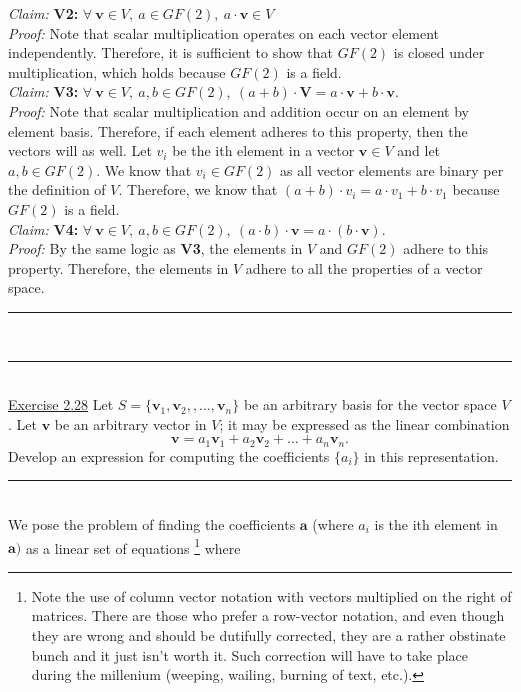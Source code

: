 \documentclass{article}
\newcommand{\problemsep}{\leavevmode\\[0.05in] \rule[\baselineskip/4]{\textwidth}{1pt} \\[0.005in] \rule[\baselineskip]{\textwidth}{1pt}\vspace{-\baselineskip}\leavevmode\\[0.05in]}
\newcommand{\statementsep}{\leavevmode\\[0.005in] \rule[\baselineskip/4]{\textwidth}{0.4pt}\leavevmode\\[0.005in]}
\begin{document}
{\it Claim: } {\bf V2: } $\forall \ \mathbf{v} \in V, \ a \in GF(2), \ a\cdot \mathbf{v} \in V$ \\[0.05in]
{\it Proof: } Note that scalar multiplication operates on each vector element independently. Therefore, it is sufficient to show that $GF(2)$ is closed under multiplication, which holds because $GF(2)$ is a field. \\[0.05in]
{\it Claim: } {\bf V3: } $\forall \ \mathbf{v} \in V, \ a,b \in GF(2), \ (a + b)\cdot \mathbf{V} = a\cdot\mathbf{v} + b\cdot\mathbf{v}$.\\[0.05in]
{\it Proof: } Note that scalar multiplication and addition occur on an element by element basis. Therefore, if each element adheres to this property, then the vectors will as well. Let $v_i$ be the ith element in a vector $\mathbf{v} \in V$ and let $a,b \in GF(2)$. We know that $v_i \in GF(2)$ as all vector elements are binary per the definition of $V$. Therefore, we know that $(a + b)\cdot v_i = a\cdot v_1 + b\cdot v_1$ because $GF(2)$ is a field. \\[0.05in]
{\it Claim: } {\bf V4: } $\forall \ \mathbf{v} \in V, \ a,b \in GF(2), \ (a\cdot b)\cdot \mathbf{v} = a\cdot(b\cdot \mathbf{v})$. \\[0.05in]
{\it Proof: } By the same logic as {\bf V3}, the elements in $V$ and $GF(2)$ adhere to this property.
Therefore, the elements in $V$ adhere to all the properties of a vector space.
\problemsep
\noindent\underline{Exercise 2.28}
Let $S = \{ \mathbf{v}_1,\mathbf{v}_2,,\hdots,\mathbf{v}_n\}$ be an arbitrary basis for the vector space $V$. Let $\mathbf{v}$ be an arbitrary vector in $V$; it may be expressed as the linear combination
\begin{equation*}
	\mathbf{v} = a_1\mathbf{v}_1 + a_2\mathbf{v}_2 + \hdots + a_n\mathbf{v}_n.
\end{equation*}
Develop an expression for computing the coefficients $\{a_i\}$ in this representation.
\statementsep
We pose the problem of finding the coefficients $\mathbf{a}$ (where $a_i$ is the ith element in $\mathbf{a})$ as a linear set of equations \footnote{\label{smartass} Note the use of column vector notation with vectors multiplied on the right of matrices.  There are those who prefer a row-vector notation, and even though they are wrong and should be dutifully corrected, they are a rather obstinate bunch and it just isn't worth it. Such correction will have to take place during the millenium (weeping, wailing, burning of text, etc.).} where
\end{document}
